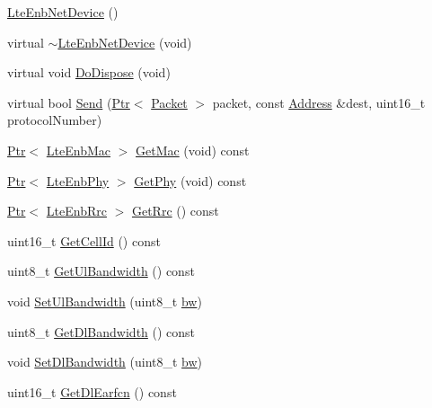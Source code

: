\begin{DoxyCompactItemize}
\item 
\hyperlink{classns3_1_1LteEnbNetDevice_ac292474e6d70ce72db9f319572e935c0}{Lte\+Enb\+Net\+Device} ()
\item 
virtual \hyperlink{classns3_1_1LteEnbNetDevice_a5fcf58669117720a1a89550522837b4f}{$\sim$\+Lte\+Enb\+Net\+Device} (void)
\item 
virtual void \hyperlink{classns3_1_1LteEnbNetDevice_a69c13266978b9ba78ec4882de3625a5b}{Do\+Dispose} (void)
\item 
virtual bool \hyperlink{classns3_1_1LteEnbNetDevice_a8e8081b535d06cf90a63144c0792564b}{Send} (\hyperlink{classns3_1_1Ptr}{Ptr}$<$ \hyperlink{classns3_1_1Packet}{Packet} $>$ packet, const \hyperlink{classns3_1_1Address}{Address} \&dest, uint16\+\_\+t protocol\+Number)
\item 
\hyperlink{classns3_1_1Ptr}{Ptr}$<$ \hyperlink{classns3_1_1LteEnbMac}{Lte\+Enb\+Mac} $>$ \hyperlink{classns3_1_1LteEnbNetDevice_ad111062cb244049477341ea8405009c7}{Get\+Mac} (void) const 
\item 
\hyperlink{classns3_1_1Ptr}{Ptr}$<$ \hyperlink{classns3_1_1LteEnbPhy}{Lte\+Enb\+Phy} $>$ \hyperlink{classns3_1_1LteEnbNetDevice_a58db72130e0740f16a5e03b22e4a10a4}{Get\+Phy} (void) const 
\item 
\hyperlink{classns3_1_1Ptr}{Ptr}$<$ \hyperlink{classns3_1_1LteEnbRrc}{Lte\+Enb\+Rrc} $>$ \hyperlink{classns3_1_1LteEnbNetDevice_a161931b1a274572b864fc13784789b98}{Get\+Rrc} () const 
\item 
uint16\+\_\+t \hyperlink{classns3_1_1LteEnbNetDevice_a6945c929a037e7a582e9e4a849dec337}{Get\+Cell\+Id} () const 
\item 
uint8\+\_\+t \hyperlink{classns3_1_1LteEnbNetDevice_acf6d570213662cdf2bfa96b3f2952798}{Get\+Ul\+Bandwidth} () const 
\item 
void \hyperlink{classns3_1_1LteEnbNetDevice_a37c83f038ac37b1208dfa89e7a91e33d}{Set\+Ul\+Bandwidth} (uint8\+\_\+t \hyperlink{lte__ue__measurements_8m_a3f7228a3941f19f282647a09dd494528}{bw})
\item 
uint8\+\_\+t \hyperlink{classns3_1_1LteEnbNetDevice_a3e52283f4b056c4a7f6f1840d4a3bb61}{Get\+Dl\+Bandwidth} () const 
\item 
void \hyperlink{classns3_1_1LteEnbNetDevice_a28cde9c5c6895b96766ca39328258683}{Set\+Dl\+Bandwidth} (uint8\+\_\+t \hyperlink{lte__ue__measurements_8m_a3f7228a3941f19f282647a09dd494528}{bw})
\item 
uint16\+\_\+t \hyperlink{classns3_1_1LteEnbNetDevice_aa3c747ff9d944c0c65501ea86fe21784}{Get\+Dl\+Earfcn} () const 

\end{DoxyCompactItemize}
